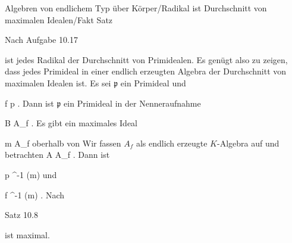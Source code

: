 {Algebren von endlichem Typ über Körper/Radikal ist Durchschnitt von maximalen Idealen/Fakt}
{Satz}
{}
{



\faktsituation {}
\faktzusatz {}
\faktzusatz {}





}
{





Nach
Aufgabe 10.17

ist jedes Radikal der Durchschnitt von Primidealen. Es genügt also zu zeigen, dass jedes Primideal in einer endlich erzeugten Algebra der Durchschnitt von maximalen Idealen ist. Es sei ${\mathfrak p}$ ein Primideal und

\mavergleichskette
{\vergleichskette
{ f
}
{ \notin }{ {\mathfrak p}
}
{  }{
}
{    }{
}
{   }{
}
}
{}{}{.}
Dann ist ${\mathfrak p}$ ein Primideal in der Nenneraufnahme

\mavergleichskette
{\vergleichskette
{ B
}
{  }{ A_f
}
{  }{
}
{    }{
}
{   }{
}
}
{}{}{.}
Es gibt ein
 {} {}
maximales Ideal

\mavergleichskette
{\vergleichskette
{ {\mathfrak m}
}
{ \subset }{ A_f
}
{  }{
}
{    }{
}
{   }{
}
}
{}{}{}
oberhalb von
 Wir fassen $A_f$ als endlich erzeugte $K$-Algebra auf und betrachten
\maabbdisp {\varphi} { A } { A_f
} {.}
Dann ist

\mavergleichskette
{\vergleichskette
{ {\mathfrak p}
}
{ \subseteq }{ \varphi^{-1} ({\mathfrak m})
}
{  }{
}
{    }{
}
{   }{
}
}
{}{}{}
und

\mavergleichskette
{\vergleichskette
{ f
}
{ \notin }{ \varphi^{-1} ({\mathfrak m})
}
{  }{
}
{    }{
}
{   }{
}
}
{}{}{.}
Nach

Satz 10.8

ist
 maximal.




}






